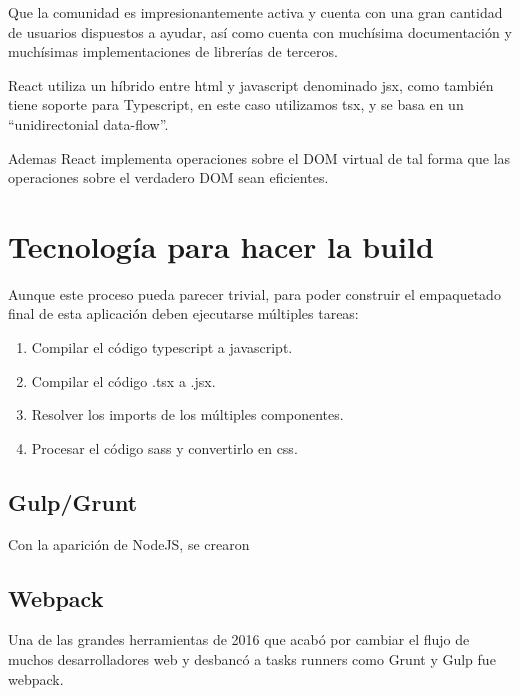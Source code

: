 \bigskip
Que la comunidad es impresionantemente activa y cuenta con una gran cantidad de usuarios dispuestos a ayudar, así como cuenta con muchísima documentación y muchísimas implementaciones de librerías de terceros.

\bigskip
React utiliza un híbrido entre html y javascript denominado jsx, como también tiene soporte para 
Typescript, en este caso utilizamos tsx, y se basa en un “unidirectonial data-flow”. 

\bigskip
Ademas React implementa operaciones sobre el DOM virtual de tal forma que las operaciones sobre
el verdadero DOM sean eficientes.

\section{Tecnología para hacer la build}
\label{3:sec3}

Aunque este proceso pueda parecer trivial, para poder construir el empaquetado final de esta aplicación
deben ejecutarse múltiples tareas:

\begin{enumerate}

\item Compilar el código typescript a javascript.

\item Compilar el código .tsx a .jsx.

\item Resolver los imports de los múltiples componentes.

\item Procesar el código sass y convertirlo en css.

\end{enumerate}

\subsection{Gulp/Grunt}

Con la aparición de NodeJS, se crearon 

\subsection{Webpack}
\bigskip
Una de las grandes herramientas de 2016 que acabó por cambiar el flujo de muchos 
desarrolladores web y desbancó a tasks runners como Grunt y Gulp fue webpack.

